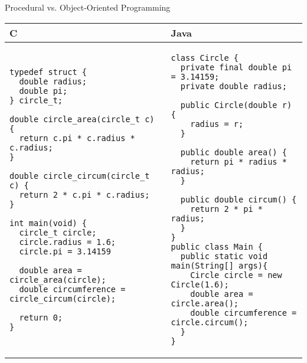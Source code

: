 \documentclass[aspectratio=169]{beamer}
\begin{document}
\begin{frame}[fragile]{Procedural vs. Object-Oriented Programming}
\centering
\begin{tabular}{@{}m{} | m{}@{}}
C					&					Java	\\
\hline
\begin{Verbatim}[fontsize=\tiny]
typedef struct {
  double radius;
  double pi;
} circle_t;

double circle_area(circle_t c) {
  return c.pi * c.radius * c.radius;
}

double circle_circum(circle_t c) {
  return 2 * c.pi * c.radius;
}

int main(void) {
  circle_t circle;
  circle.radius = 1.6;
  circle.pi = 3.14159
  
  double area = circle_area(circle);
  double circumference = circle_circum(circle);
	
  return 0;
}
\end{Verbatim}	

&

\begin{Verbatim}[fontsize=\tiny]
class Circle {
  private final double pi = 3.14159;
  private double radius;
  
  public Circle(double r) {
    radius = r;
  }
  
  public double area() {
    return pi * radius * radius;
  }
  
  public double circum() {
    return 2 * pi * radius;
  }
}
public class Main {
  public static void main(String[] args){
    Circle circle = new Circle(1.6);
    double area = circle.area();
    double circumference = circle.circum();
  }
}
\end{Verbatim}	

\end{tabular}

\end{frame}
\end{document}

